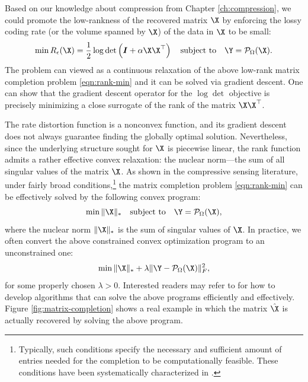 \documentclass[../../book-main.tex]{subfiles}
\begin{document}
Based on our knowledge about compression from Chapter
\ref{ch:compression}, we could  promote the low-rankness of the
recovered matrix $\X$ by enforcing the lossy coding rate (or the
volume spanned by $\X$) of the data in $\X$ to be small:
\begin{equation}
\min R_\epsilon(\X) = \frac{1}{2} \log \det \left(\boldsymbol{I} +
\alpha  \X\X^\top \right) \quad \mbox{subject to}
\quad
\Y = \mathcal{P}_{\Omega}(\X).
\label{eqn:rate-min}
\end{equation}
The problem can viewed as a continuous relaxation of the above
low-rank matrix completion problem \eqref{eqn:rank-min} and it can be
solved via gradient descent. One can show that the gradient descent
operator for the $\log\det$ objective is precisely minimizing a close
surrogate of the rank of the matrix $\X\X^\top$.

The rate distortion function is a nonconvex function, and its gradient
descent does not always guarantee finding the globally optimal solution. Nevertheless, since the underlying structure sought for $\X$ is piecewise linear, the rank function admits a rather effective convex relaxation: the
nuclear norm---the sum of all singular values of the matrix $\X$. As
shown in the compressive sensing literature, under fairly
broad conditions,\footnote{Typically, such conditions specify the
necessary and sufficient amount of entries needed for the completion
to be computationally feasible. These conditions have been
systematically characterized in \cite{Wright-Ma-2022}.} the matrix
completion problem \eqref{eqn:rank-min}
can be effectively solved by the following convex program:
\begin{equation}
\min \|\X\|_* \quad \mbox{subject to}
\quad
\Y = \mathcal{P}_{\Omega}(\X),
\label{eqn:nuclear-min}
\end{equation}
where the nuclear norm $\|\X\|_*$ is the sum of singular values of
$\X$. In practice, we often convert the above constrained convex optimization
program to an unconstrained one:
\begin{equation}
\min \|\X\|_*  + \lambda \|
\Y - \mathcal{P}_{\Omega}(\X)\|_F^2,
\label{eqn:nuclear-min-lagrangian}
\end{equation}
for some properly chosen $\lambda > 0$. Interested readers may refer to
\cite{Wright-Ma-2022} for how to develop algorithms  that can solve
the above programs  efficiently and effectively.
Figure \ref{fig:matrix-completion} shows a real example in which the
matrix $\hat \X$ is actually recovered by solving the above program.
\end{document}
